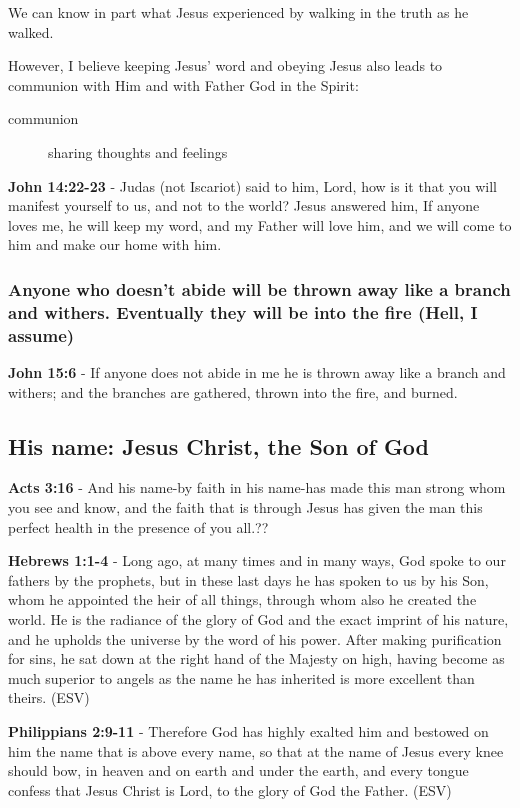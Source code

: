 \documentclass[11pt]{article}
\begin{document}
We can know in part what Jesus experienced by walking in the truth as he walked.

However, I believe keeping Jesus' word and obeying Jesus also leads to communion with Him and with Father God in the Spirit:

\begin{description}
\item[{communion}] sharing thoughts and feelings
\end{description}

\textbf{John 14:22-23} - Judas (not Iscariot) said to him, Lord, how is it that you will manifest yourself to us, and not to the world? Jesus answered him, If anyone loves me, he will keep my word, and my Father will love him, and we will come to him and make our home with him.

\subsubsection{Anyone who doesn't abide will be thrown away like a branch and withers. Eventually they will be into the fire (Hell, I assume)}
\label{sec:orgb843ce5}
\textbf{John 15:6} - If anyone does not abide in me he is thrown away like a branch and withers; and the branches are gathered, thrown into the fire, and burned.

\subsection{His name: Jesus Christ, the Son of God}
\label{sec:orgb9d8549}
\textbf{Acts 3:16} - And his name-by faith in his name-has made this man strong whom you see and know, and the faith that is through Jesus has given the man this perfect health in the presence of you all.??

\textbf{Hebrews 1:1-4} -  Long ago, at many times and in many ways, God spoke to our fathers by the prophets, but in these last days he has spoken to us by his Son, whom he appointed the heir of all things, through whom also he created the world.  He is the radiance of the glory of God and the exact imprint of his nature, and he upholds the universe by the word of his power.  After making purification for sins, he sat down at the right hand of the Majesty on high, having become as much superior to angels as the name he has inherited is more excellent than theirs. (ESV)

\textbf{Philippians 2:9-11} - Therefore God has highly exalted him and bestowed on him the name that is above every name, so that at the name of Jesus every knee should bow, in heaven and on earth and under the earth, and every tongue confess that Jesus Christ is Lord, to the glory of God the Father. (ESV)
\end{document}

